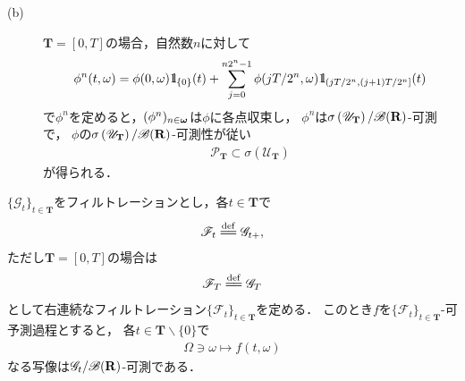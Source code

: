 \begin{sketch}
\begin{description}
\begin{description}
					\item[(b)] $\mathbf{T} = [0,T]$の場合，自然数$n$に対して
						\begin{align}
							\phi^n(t,\omega)
							= \phi(0,\omega)\mbox{1}\hspace{-0.25em}\mbox{l}_{\{0\}}(t) + 
							\sum_{j=0}^{n2^n-1}\phi(jT/2^n,\omega) \mbox{1}\hspace{-0.25em}\mbox{l}_{(jT/2^n,(j+1)T/2^n]}(t)
						\end{align}
						で$\phi^n$を定めると，$(\phi^n)_{n\in{\boldsymbol \omega}}$は$\phi$に各点収束し，
						$\phi^n$は$\sigma\left(\mathscr{U}_{\mathbf{T}}\right)/\mathscr{B}(\mathbf{R})$-可測で，
						$\phi$の$\sigma\left(\mathscr{U}_{\mathbf{T}}\right)/\mathscr{B}(\mathbf{R})$-可測性が従い
						\begin{align}
							\mathscr{P}_{\mathbf{T}} \subset \sigma\left(\mathscr{U}_{\mathbf{T}}\right)
						\end{align}
						が得られる．\QED
				\end{description}
		\end{description}
	\end{sketch}
	
	\begin{screen}
		\begin{thm}[右連続化したフィルトレーションに関する可予測過程は元のフィルトレーションに適合する]
		\label{thm:predictable_process_adapted_to_right_continuous_filtration}
			$\{\mathscr{G}_t\}_{t \in \mathbf{T}}$をフィルトレーションとし，各$t \in \mathbf{T}$で
			\begin{align}
				\mathscr{F}_t \defeq \mathscr{G}_{t+},
			\end{align}
			ただし$\mathbf{T} = [0,T]$の場合は
			\begin{align}
				\mathscr{F}_T \defeq \mathscr{G}_{T}
			\end{align}
			として右連続なフィルトレーション$\{\mathscr{F}_t\}_{t \in \mathbf{T}}$を定める．
			このとき$f$を$\{\mathscr{F}_t\}_{t \in \mathbf{T}}$-可予測過程とすると，
			各$t \in \mathbf{T} \backslash \{0\}$で
			\begin{align}
				\Omega \ni \omega \longmapsto f(t,\omega)
			\end{align}
			なる写像は$\mathscr{G}_t/\mathscr{B}(\mathbf{R})$-可測である．
		\end{thm}
	\end{screen}
	
